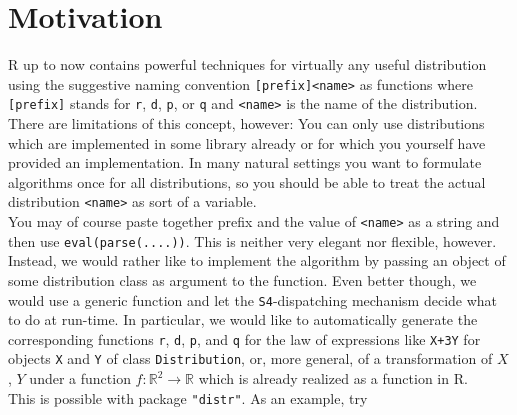 \documentclass[11pt]{article}
\newcommand{\code}[1]{{\tt #1}}
\newcommand{\pkg}[1]{{\tt "#1"}}
\newcommand{\Reals}{\mathbb{R}}
\begin{document}
\section{Motivation}
{\sf R} up to now contains powerful techniques for virtually
any useful distribution using the suggestive naming convention
{\tt [prefix]<name>} as functions where {\tt [prefix]} stands for
 {\tt r}, {\tt d}, {\tt p}, or {\tt q}
 and {\tt <name>} is the name of the distribution.\\
There are limitations of this concept, however:
You can only use distributions which are implemented in some library
already or for which you yourself have provided an implementation.
In many natural settings you want to formulate algorithms once for
all distributions, so you should be able to treat the actual distribution 
{\tt <name>} as sort of a variable.\\
You may of course paste together prefix and the value of {\tt <name>} as a 
string and then use \code{eval(parse(....))}. This is neither very elegant nor 
flexible, however.\\
%
Instead, we would rather like to implement the algorithm by passing an object of 
some distribution class as argument to the function. Even better though, we 
would use a generic function and let the {\tt S4}-dispatching mechanism decide 
what to do at run-time. In particular, we would like to automatically generate 
the corresponding functions {\tt r}, {\tt d}, {\tt p}, and {\tt q} for the law 
of expressions like \code{X+3Y} for objects \code{X} and \code{Y} of class 
\code{Distribution}, or, more general, of a transformation of $X$, $Y$ under a 
function $f\colon \Reals^2 \to \Reals$ which is already realized as a function 
in {\sf R}.\\
This is possible with package \pkg{distr}. As an example, try
\end{document}
